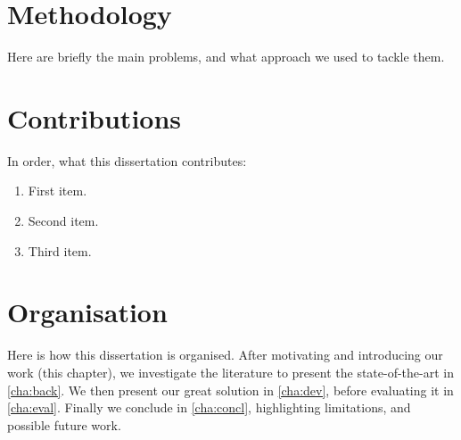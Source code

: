 \section{Methodology}
\label{sec:intro_method}

Here are briefly the main problems, and what approach we used to tackle them.

\section{Contributions}
\label{sec:intro_contrib}

In order, what this dissertation contributes:
\begin{enumerate}
    \item First item.
    \item Second item.
    \item Third item.
\end{enumerate}

\section{Organisation}
\label{sec:intro_orga}

Here is how this dissertation is organised. After motivating and introducing our work (this chapter), we investigate the literature to present the state-of-the-art in \cref{cha:back}. We then present our great solution in \cref{cha:dev}, before evaluating it in \cref{cha:eval}. Finally we conclude in \cref{cha:concl}, highlighting limitations, and possible future work.